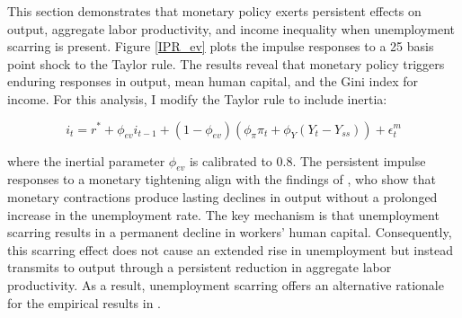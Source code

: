 This section demonstrates that monetary policy exerts persistent effects on output, aggregate labor productivity, and income inequality when unemployment scarring is present. Figure \ref{IPR_ev} plots the impulse responses to a 25 basis point shock to the Taylor rule. The results reveal that monetary policy triggers enduring responses in output, mean human capital, and the Gini index for income. For this analysis, I modify the Taylor rule to include inertia: 


$$i_{t} = r^{*} + \phi_{ev} i_{t-1} + (1-\phi_{ev})(\phi_{\pi} \pi_{t} + \phi_{Y} (Y_{t} - Y_{ss})) + \epsilon^{m}_{t}$$

where the inertial parameter $\phi_{ev}$ is calibrated to 0.8. The persistent impulse responses to a monetary tightening align with the findings of \cite{Jorda2023}, who show that monetary contractions produce lasting declines in output without a prolonged increase in the unemployment rate. The key mechanism is that unemployment scarring results in a permanent decline in workers' human capital. Consequently, this scarring effect does not cause an extended rise in unemployment but instead transmits to output through a persistent reduction in aggregate labor productivity. As a result, unemployment scarring offers an alternative rationale for the empirical results in \cite{Jorda2023}.





